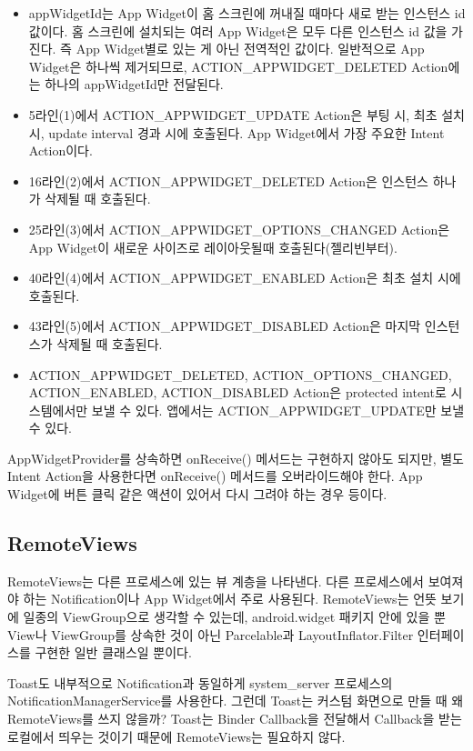 \begin{itemize}
\item appWidgetId는 App Widget이 홈 스크린에 꺼내질 때마다 새로 받는 인스턴스 id 값이다. 홈 스크린에 설치되는 여러 App Widget은 모두 다른 인스턴스 id 값을 가진다. 즉 App Widget별로 있는 게 아닌 전역적인 값이다.
일반적으로 App Widget은 하나씩 제거되므로, ACTION\_APPWIDGET\_DELETED Action에는 하나의 appWidgetId만 전달된다.
\item 5라인(1)에서 ACTION\_APPWIDGET\_UPDATE Action은 부팅 시, 최초 설치 시, update interval 경과 시에 호출된다. App Widget에서 가장 주요한 Intent Action이다.
\item 16라인(2)에서 ACTION\_APPWIDGET\_DELETED Action은 인스턴스 하나가 삭제될 때 호출된다.
\item 25라인(3)에서 ACTION\_APPWIDGET\_OPTIONS\_CHANGED Action은 App Widget이 새로운 사이즈로 레이아웃될때 호출된다(젤리빈부터).
\item 40라인(4)에서 ACTION\_APPWIDGET\_ENABLED Action은 최초 설치 시에 호출된다.
\item 43라인(5)에서 ACTION\_APPWIDGET\_DISABLED Action은 마지막 인스턴스가 삭제될 때 호출된다.
\item ACTION\_APPWIDGET\_DELETED, ACTION\_OPTIONS\_CHANGED, ACTION\_\-ENABLED,
ACTION\_DISABLED Action은 protected intent로 시스템에서만 보낼 수 있다.
앱에서는 ACTION\_A\-PP\-WIDGET\_UPDATE만 보낼 수 있다.
\end{itemize}

AppWidgetProvider를 상속하면 onReceive() 메서드는 구현하지 않아도 되지만, 별도 Intent Action을 사용한다면 onReceive() 메서드를 오버라이드해야 한다. App Widget에 버튼 클릭 같은 액션이 있어서 다시 그려야 하는 경우 등이다.

\subsection{RemoteViews}
RemoteViews는 다른 프로세스에 있는 뷰 계층을 나타낸다. 다른 프로세스에서 보여져야 하는 Notification이나 App Widget에서 주로 사용된다.
RemoteViews는 언뜻 보기에 일종의 ViewGroup으로 생각할 수 있는데, android.widget 패키지 안에 있을 뿐 View나 ViewGroup를 상속한 것이 아닌 Parcelable과 LayoutInflator.Filter 인터페이스를 구현한 일반 클래스일 뿐이다.\\

\colorbox{tearose}{\parbox[t]{15cm}{
Toast도 내부적으로 Notification과 동일하게 system\_server 프로세스의 NotificationManagerService를 사용한다. 그런데 Toast는 커스텀 화면으로 만들 때 왜 RemoteViews를 쓰지 않을까? Toast는 Binder Callback을 전달해서 Callback을 받는 로컬에서 띄우는 것이기 때문에 RemoteViews는 필요하지 않다.
}}\newline\newline

